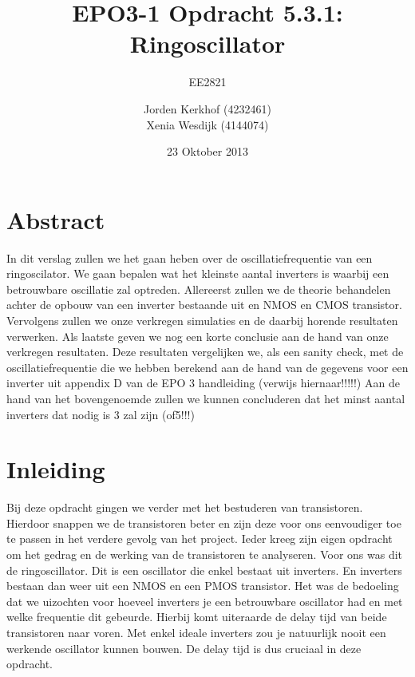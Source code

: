 \documentclass{scrartcl}  %
\author{Jorden {Kerkhof} (4232461)  \\{Xenia Wesdijk} (4144074)}
\title{EPO3-1   Opdracht 5.3.1: Ringoscillator}
\subtitle{EE2821}
\date{23 Oktober 2013}
\begin{document}
\maketitle
\vspace{80 mm}
\section*{Abstract}
In dit verslag zullen we het gaan heben over de oscillatiefrequentie van een ringoscilator. We gaan bepalen wat het kleinste aantal inverters is waarbij een betrouwbare oscillatie zal optreden.
Allereerst zullen we de theorie behandelen achter de opbouw van een inverter bestaande uit en NMOS en CMOS transistor. 
Vervolgens zullen we onze verkregen simulaties en de daarbij horende resultaten verwerken. Als laatste geven we nog een korte conclusie aan de hand van onze verkregen resultaten. Deze resultaten vergelijken we, als een sanity check,
met de oscillatiefrequentie die we hebben berekend aan de hand van de gegevens voor een inverter uit appendix D van de EPO 3 handleiding (verwijs hiernaar!!!!!)
Aan de hand van het bovengenoemde zullen we kunnen concluderen dat het minst aantal inverters dat nodig is 3 zal zijn (of5!!!)



\newpage
\setlength{\cftbeforetoctitleskip}{-3em}
\tableofcontents
\newpage
\section{Inleiding}
Bij deze opdracht gingen we verder met het bestuderen van transistoren. Hierdoor snappen we de transistoren beter en zijn deze voor ons eenvoudiger toe te passen in het verdere gevolg van het project. Ieder kreeg zijn eigen opdracht om het gedrag en de werking van de transistoren te analyseren. Voor ons was dit de ringoscillator. Dit is een oscillator die enkel bestaat uit inverters. En inverters bestaan dan weer uit een NMOS en een PMOS transistor. Het was de bedoeling dat we uizochten voor hoeveel inverters je een betrouwbare oscillator had en met welke frequentie dit gebeurde. Hierbij komt uiteraarde de delay tijd van beide transistoren naar voren. Met enkel ideale inverters zou je natuurlijk nooit een werkende oscillator kunnen bouwen. De delay tijd is dus cruciaal in deze opdracht.  
\end{document}
